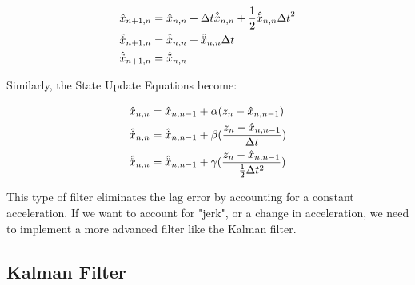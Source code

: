         \begin{subequations}
            \labeq{see_dynamic_model_2}
            \begin{align}
                \hat{x}_{n+1,n} &= \hat{x}_{n,n} + \Delta t \hat{\dot{x}}_{n,n} + \frac{1}{2} \hat{\ddot{x}}_{n,n} {\Delta t}^2 \labeq{see_disp_2}\\
                \hat{\dot{x}}_{n+1,n} &= \hat{\dot{x}}_{n,n} + \hat{\ddot{x}}_{n,n} \Delta t \labeq{see_velocity_2} \\
                \hat{\ddot{x}}_{n+1,n} &= \hat{\ddot{x}}_{n,n}
            \end{align}
        \end{subequations}

        Similarly, the State Update Equations become:

        \begin{subequations}
            \labeq{sue_abg}
            \begin{align}
                \hat{x}_{n,n} &= \hat{x}_{n,n-1} + \alpha (z_n - \hat{x}_{n,n-1}) \labeq{sue_abg_disp}\\
                \hat{\dot{x}}_{n,n} &= \hat{\dot{x}}_{n,n-1} + \beta (\frac{z_n - \hat{x}_{n,n-1}}{\Delta t}) \labeq{sue_abg_velocity} \\
                \hat{\ddot{x}}_{n,n} &= \hat{\ddot{x}}_{n,n-1} + \gamma (\frac{z_n - \hat{x}_{n,n-1}}{\frac{1}{2} \Delta t^2}) \labeq{sue_abg_accel}
            \end{align}
        \end{subequations}

        This type of filter eliminates the lag error by accounting for a constant acceleration.
        If we want to account for "jerk", or a change in acceleration, we need to implement a more advanced filter like the Kalman filter.

        \subsection{Kalman Filter} 
